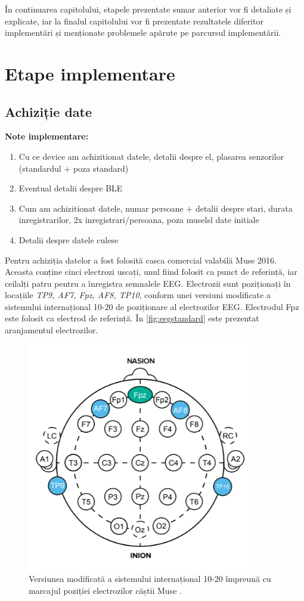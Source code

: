 În continuarea capitolului, etapele prezentate sumar anterior vor fi detaliate și explicate, iar la finalul capitolului vor fi prezentate rezultatele diferitor implementări și menționate problemele apărute pe parcursul implementării.

\section{Etape implementare}

\subsection{Achiziție date}

\textbf{Note implementare:}
\begin{enumerate}
\item Cu ce device am achizitionat datele, detalii despre el, plasarea senzorilor (standardul + poza standard)
\item Eventual detalii despre BLE
\item Cum am achizitionat datele, numar persoane + detalii despre stari, durata inregistrarilor, 2x inregistrari/persoana, poza muselsl date initiale
\item  Detalii despre datele culese
\end{enumerate}

Pentru achiziția datelor a fost folosită casca comercial valabilă Muse 2016. Aceasta conține cinci electrozi uscați, unul fiind folosit ca punct de referință, iar ceilalți patru pentru a înregistra semnalele EEG. Electrozii sunt poziționați în locațiile \textit{TP9, AF7, Fpz, AF8, TP10}, conform unei versiuni modificate a sistemului internațional 10-20 de poziționare al electrozilor EEG. Electrodul Fpz este folosit ca electrod de referință. În \autoref{fig:eegstandard} este prezentat aranjamentul electrozilor.

\begin{figure}[ht]
\centering
\includegraphics[width=10cm, keepaspectratio]{fig/cap3/EEGstandard.png}
\caption{Versiunea modificată a sistemului internațional 10-20 împreună cu marcajul poziției electrozilor căștii Muse \cite{online:muse-eeg}.}
\label{fig:eegstandard}
\end{figure}

